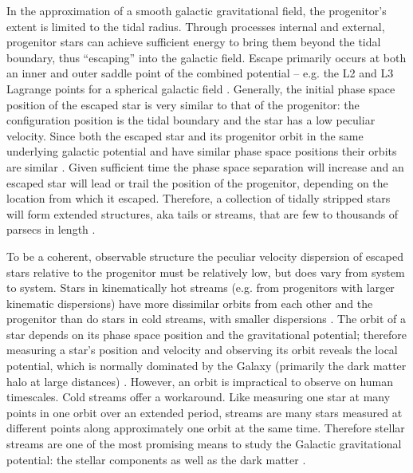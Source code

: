 \documentclass[fleqn,usenatbib]{mnras}
\begin{document}
  In the approximation of a smooth galactic gravitational field, the
  progenitor's extent is limited to the tidal radius. Through processes internal
  and external, progenitor stars can achieve sufficient energy to bring them
  beyond the tidal boundary, thus ``escaping'' into the galactic field. Escape
  primarily occurs at both an inner and outer saddle point of the combined
  potential -- e.g. the L2 and L3 Lagrange points for a spherical galactic field
  \citep{Ross1997, Fukushige2000, BinneyTremaine2008}. Generally, the initial
  phase space position of the escaped star is very similar to that of the
  progenitor: the configuration position is the tidal boundary and the star has
  a low peculiar velocity. Since both the escaped star and its progenitor orbit
  in the same underlying galactic potential and have similar phase space
  positions their orbits are similar \citep{BinneyTremaine2008}. Given
  sufficient time the phase space separation will increase and an escaped star
  will lead or trail the position of the progenitor, depending on the location
  from which it escaped. Therefore, a collection of tidally stripped stars will
  form extended structures, aka tails or streams, that are few to thousands of
  parsecs in length \citep{Johnston1998, HelmiWhite1999, Bovy2014}.

  To be a coherent, observable structure the peculiar velocity dispersion of
  escaped stars relative to the progenitor must be relatively low, but does vary
  from system to system. Stars in kinematically hot streams (e.g. from
  progenitors with larger kinematic dispersions) have more dissimilar orbits
  from each other and the progenitor than do stars in cold streams, with smaller
  dispersions \citep{Johnston1998, Hendel2015}. The orbit of a star depends on
  its phase space position and the gravitational potential; therefore measuring
  a star's position and velocity and observing its orbit reveals the local
  potential, which is normally dominated by the Galaxy (primarily the dark
  matter halo at large distances) \citep{Gibbons2014}. However, an orbit is
  impractical to observe on human timescales. Cold streams offer a workaround.
  Like measuring one star at many points in one orbit over an extended period,
  streams are many stars measured at different points along approximately one
  orbit at the same time. Therefore stellar streams are one of the most
  promising means to study the Galactic gravitational potential: the stellar
  components as well as the dark matter \citep{Johnston2016}.
  
\end{document}
